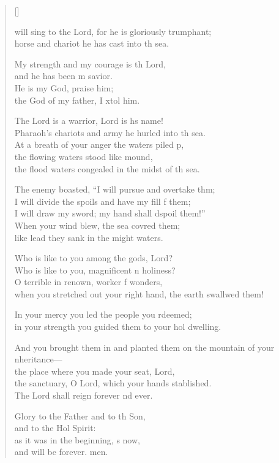\settowidth{\versewidth}{And you brought them in and planted them on the mountain of your inheritance— *}
\begin{verse}[\versewidth]
  \begin{patverse}
     will sing to the Lord, for he is gloriously tr\pointup{\i}umphant;\Med\\
horse and chariot he has cast into th sea.

My strength and my courage is th Lord,\Med\\
and he has been m savior.\\
He is my God,  praise him;\Med\\
the God of my father, I xtol him.

The Lord is a warrior, Lord is h\pointup{\i}s name!\Med\\
Pharaoh’s chariots and army he hurled into th sea.\\
At a breath of your anger the waters piled p,\Flex\\
the flowing waters stood like  mound,\Med\\
the flood waters congealed in the midst of th sea.

The enemy boasted, “I will pursue and overtake thm;\Flex\\
I will divide the spoils and have my fill f them;\Med\\
I will draw my sword; my hand shall dspoil them!”\\
When your wind blew, the sea covred them;\Med\\
like lead they sank in the might waters.

Who is like to you among the gods,  Lord?\Med\\
Who is like to you, magnificent \pointup{\i}n holiness?\\
O terrible in renown, worker f wonders,\Med\\
when you stretched out your right hand, the earth swallwed them!

In your mercy you led the people you rdeemed;\Med\\
in your strength you guided them to your hol dwelling.

And you brought them in and planted them on the mountain of your \pointup{\i}nheritance—\Med\\
the place where you made your seat,  Lord,\\
the sanctuary, O Lord, which your hands stablished.\Med\\
The Lord shall reign forever nd ever.

Glory to the Father and to th Son,\Med\\
and to the Hol Spirit:\\
as it was in the beginning, \pointup{\i}s now,\Med\\
and will be forever. men. 
  \end{patverse}
\end{verse}
